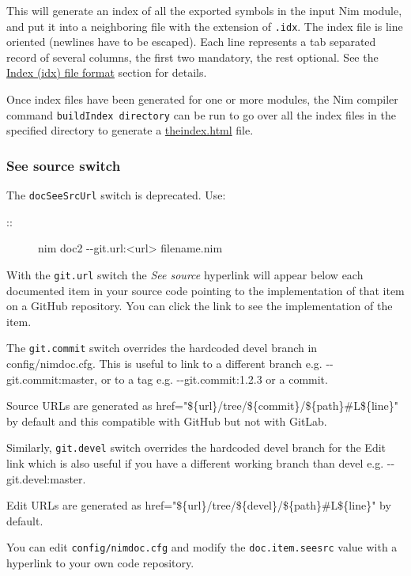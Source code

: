 This will generate an index of all the exported symbols in the input Nim
module, and put it into a neighboring file with the extension of
\texttt{.idx}. The index file is line oriented (newlines have to be
escaped). Each line represents a tab separated record of several
columns, the first two mandatory, the rest optional. See the
\protect\hyperlink{index-idx-file-format}{Index (idx) file format}
section for details.

Once index files have been generated for one or more modules, the Nim
compiler command \texttt{buildIndex\ directory} can be run to go over
all the index files in the specified directory to generate a
\url{theindex.html} file.

\hypertarget{see-source-switch}{%
\subsubsection{See source switch}\label{see-source-switch}}

The \texttt{docSeeSrcUrl} switch is deprecated. Use:

\begin{description}
\item[::]
nim doc2 -\/-git.url:\textless url\textgreater{} filename.nim
\end{description}

With the \texttt{git.url} switch the \emph{See source} hyperlink will
appear below each documented item in your source code pointing to the
implementation of that item on a GitHub repository. You can click the
link to see the implementation of the item.

The \texttt{git.commit} switch overrides the hardcoded {devel} branch in
config/nimdoc.cfg. This is useful to link to a different branch e.g.
{-\/-git.commit:master}, or to a tag e.g. {-\/-git.commit:1.2.3} or a
commit.

Source URLs are generated as
{href="\$\{url\}/tree/\$\{commit\}/\$\{path\}\#L\$\{line\}"} by default
and this compatible with GitHub but not with GitLab.

Similarly, \texttt{git.devel} switch overrides the hardcoded {devel}
branch for the {Edit} link which is also useful if you have a different
working branch than {devel} e.g. {-\/-git.devel:master}.

Edit URLs are generated as
{href="\$\{url\}/tree/\$\{devel\}/\$\{path\}\#L\$\{line\}"} by default.

You can edit \texttt{config/nimdoc.cfg} and modify the
\texttt{doc.item.seesrc} value with a hyperlink to your own code
repository.

